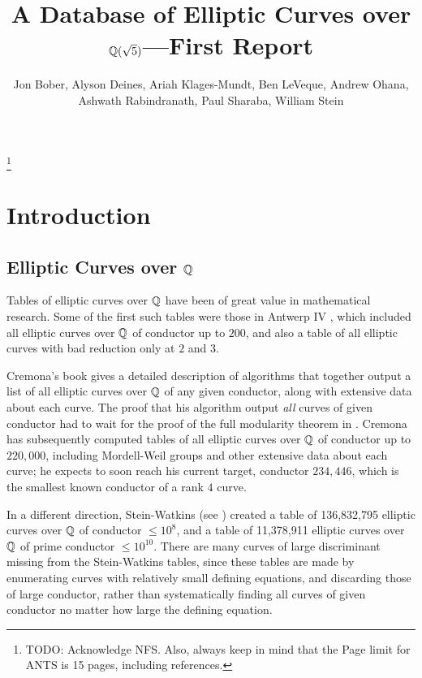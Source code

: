 \documentclass{amsart}
\title{A Database of Elliptic Curves over $\mathbb{Q}(\sqrt{5})$---First Report}
\author[Bober et al.]{Jon Bober, Alyson Deines, Ariah Klages-Mundt, Ben
  LeVeque, Andrew Ohana, Ashwath Rabindranath, Paul Sharaba, William
  Stein}
\begin{document}
\begin{abstract} 
\end{abstract} 

\maketitle

\footnote{TODO: Acknowledge NFS.  Also, always keep in mind that the
  Page limit for ANTS is 15 pages, including references.}

\section{Introduction}\label{sec:intro}

\subsection{Elliptic Curves over $\mathbb{Q}$}
Tables of elliptic curves over $\mathbb{Q}$ have been of great value in
mathematical research.  Some of the first such tables were those in
Antwerp IV \cite{antwerpiv}, which included all elliptic curves over
$\mathbb{Q}$ of conductor up to $200$, and also a table of all elliptic curves
with bad reduction only at $2$ and $3$.  

Cremona's book \cite{cremona:algs} gives a detailed description of
algorithms that together output a list of all elliptic curves over
$\mathbb{Q}$ of any given conductor, along with extensive data about each
curve.  The proof that his algorithm output {\em all} curves of given
conductor had to wait for the proof of the full modularity theorem in
\cite{breuil-conrad-diamond-taylor}.  Cremona has subsequently
computed tables \cite{cremona:onlinetables} of all elliptic curves
over $\mathbb{Q}$ of conductor up to $220,\!000$, including Mordell-Weil
groups and other extensive data about each curve; he expects to soon
reach his current target, conductor $234,\!446$, which is the smallest
known conductor of a rank $4$ curve.

In a different direction, Stein-Watkins (see \cite{stein-watkins:ants5, bmsw:bulletins}) 
created a table of 136,832,795 elliptic curves over $\mathbb{Q}$ of conductor $\leq 10^8$, and a
table of 11,378,911 elliptic curves over $\mathbb{Q}$ of prime conductor $\leq
10^{10}$. 
There are many curves of large discriminant missing from the
Stein-Watkins tables, since these tables are made by enumerating
curves with relatively small defining equations, and discarding those
of large conductor, rather than systematically finding all curves of
given conductor no matter how large the defining equation.
\end{document}
